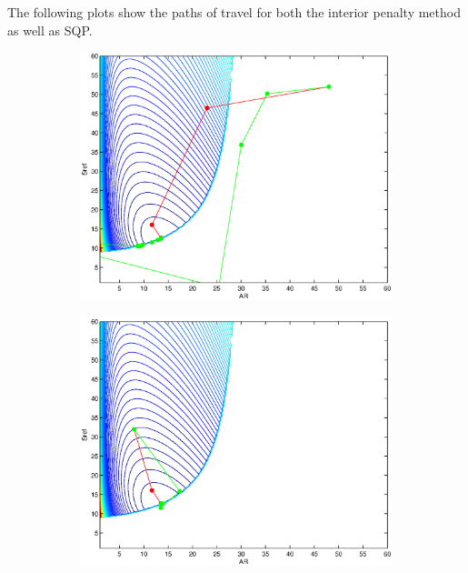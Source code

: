 \documentclass[12pt,parskip=full]{article}
\numberwithin{subsection}{section}
\begin{document}
			The following plots show the paths of travel for both the interior penalty method as well as SQP.
			\begin{figure}[!ht]
				\centering
				\begin{subfigure}[h]{0.45\textwidth}
					\includegraphics[width=\textwidth]{Opt1.eps}
				\end{subfigure}
				\begin{subfigure}[h]{0.45\textwidth}
					\includegraphics[width=\textwidth]{Opt2.eps}

\end{subfigure}
\end{figure}
\end{document}
